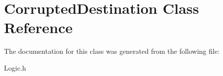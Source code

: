 \hypertarget{class_corrupted_destination}{\section{Corrupted\+Destination Class Reference}
\label{class_corrupted_destination}
}


The documentation for this class was generated from the following file\+:\begin{DoxyCompactItemize}
\item 
Logic.\+h\end{DoxyCompactItemize}
